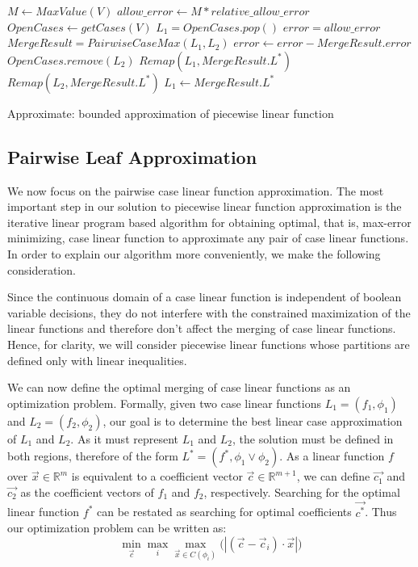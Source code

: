 \incmargin{1.5em}
\linesnumbered
\begin{algorithm}[!ht]
\dontprintsemicolon
{}
$M \gets MaxValue(V)$
$allow\_error \gets M * relative\_allow\_error$
$OpenCases \gets getCases(V)$\;
 {
	$L_1 = OpenCases.pop()$\;
	$error = allow\_error$\;
	  { 
		$MergeResult = PairwiseCaseMax( L_1, L_2)$\;
		{
			$error \gets error - MergeResult.error$\;
			$OpenCases.remove(L_2)$\;
			$ Remap(L_1, MergeResult.L^*) $\;
			$ Remap(L_2, MergeResult.L^*) $\;
			$ L_1 \gets MergeResult.L^* $\;
		}
	}
}
\;
\caption{{\sc Approximate}: bounded approximation of piecewise linear function}
\label{alg:approx}
\end{algorithm}
\decmargin{1.5em}

\subsection{Pairwise Leaf Approximation}

We now focus on the pairwise case linear function approximation. The most important step in our solution to piecewise linear function approximation is the iterative linear program based algorithm for obtaining optimal, that is, max-error minimizing, case linear function to approximate any pair of case linear functions. In order to explain our algorithm more conveniently, we make the following consideration.

Since the continuous domain of a case linear function is independent of boolean variable decisions, they do not interfere with the constrained maximization of the linear functions and therefore don't affect the merging of case linear functions. Hence, for clarity, we will consider piecewise linear functions whose partitions are defined only with linear inequalities.

We can now define the optimal merging of case linear functions as an optimization problem. Formally, given two case linear functions $L_1 = ( f_1, \phi_1 )$ and $L_2 = ( f_2, \phi_2 )$, our goal is to determine the best linear case approximation of $L_1$ and $L_2$. As it must represent  $L_1$ and $L_2$, the solution must be defined in both regions, therefore of the form $L^* = (f^*,\phi_1 \lor  \phi_2)$. As a linear function $f$ over $\vec{x} \in \mathbb{R}^m$ is equivalent to a coefficient vector $\vec{c} \in \mathbb{R}^{m+1}$, we can define $\vec{c_1}$ and $\vec{c_2}$ as the coefficient vectors of $f_1$ and $f_2$, respectively. Searching for the optimal linear function $f^*$ can be restated as searching for optimal coefficients $\vec{c^*}$. Thus our optimization problem can be written as:
\begin{equation} \min_{\vec{c}} \max_{i} \max_{\vec{x} \in C(\phi_i)} \big( |(\vec{c} - \vec{c}_i)\cdot \vec{x}| \big)  \label{eq:optimglo} \end{equation}

